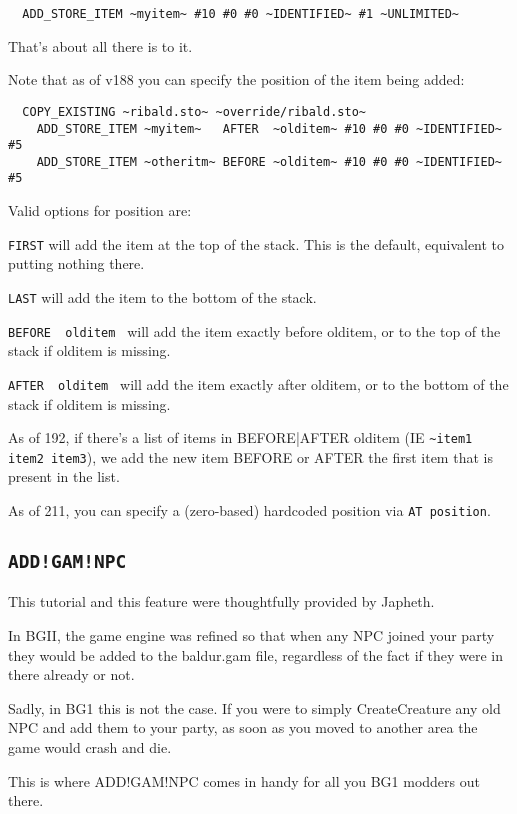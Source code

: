 \documentclass{article}
\def\DEFINE#1{{\tt \bf #1}\label{#1}\index{#1}}
\def\t#1{{\tt #1}}
\begin{document}
\begin{verbatim}
  ADD_STORE_ITEM ~myitem~ #10 #0 #0 ~IDENTIFIED~ #1 ~UNLIMITED~
\end{verbatim}

  That's about all there is to it.
  

Note that as of v188 you can specify the position of the item being added:
\begin{verbatim}
  COPY_EXISTING ~ribald.sto~ ~override/ribald.sto~
    ADD_STORE_ITEM ~myitem~   AFTER  ~olditem~ #10 #0 #0 ~IDENTIFIED~ #5
    ADD_STORE_ITEM ~otheritm~ BEFORE ~olditem~ #10 #0 #0 ~IDENTIFIED~ #5
\end{verbatim}
  Valid options for position are:

  \t{FIRST} will add the item at the top of the stack.
     This is the default, equivalent to putting nothing there.

  \t{LAST} will add the item to the bottom of the stack.

  \t{BEFORE ~olditem~} will add the item exactly before olditem,
    or to the top of the stack if olditem is missing.

  \t{AFTER  ~olditem~} will add the item exactly after olditem,
    or to the bottom of the stack if olditem is missing.

As of 192, if there's a list of items in BEFORE|AFTER olditem (IE \verb+~item1 item2 item3+), 
we add the new item BEFORE or AFTER the first item that is present in the list.

As of 211, you can specify a (zero-based) hardcoded position via \verb+AT position+.

\subsection{\DEFINE{ADD!GAM!NPC}}
This tutorial and this feature were thoughtfully provided by Japheth. 

In BGII, the game engine was refined so that when any NPC joined your party
they would be added to the baldur.gam file, regardless of the fact if they
were in there already or not.

Sadly, in BG1 this is not the case.  If you were to simply CreateCreature
any old NPC and add them to your party, as soon as you moved to another
area the game would crash and die.

This is where ADD!GAM!NPC comes in handy for all you BG1 modders out there.
\end{document}
